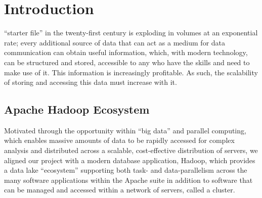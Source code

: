 \documentclass[journal]{IEEEtran}
\begin{document}
%
\IEEEpeerreviewmaketitle



\section{Introduction}
% 
% 
% 
% 
 ``starter file'' in the twenty-first century is exploding in volumes at an exponential rate; every additional source of data that can act as a medium for data communication can obtain useful information, which, with modern technology, can be structured and stored, accessible to any who have the skills and need to make use of it. This information is increasingly profitable. As such, the scalability of storing and accessing this data must increase with it.
\\
\subsection{Apache Hadoop Ecosystem}
Motivated through the opportunity within ``big data'' and parallel computing, which enables massive amounts of data to be rapidly accessed for complex analysis and distributed across a scalable, cost-effective distribution of servers, we aligned our project with a modern database application, Hadoop, which provides a data lake ``ecosystem'' supporting both task- and data-parallelism across the many software applications within the Apache suite in addition to software that can be managed and accessed within a network of servers, called a cluster.
\\
\end{document}
